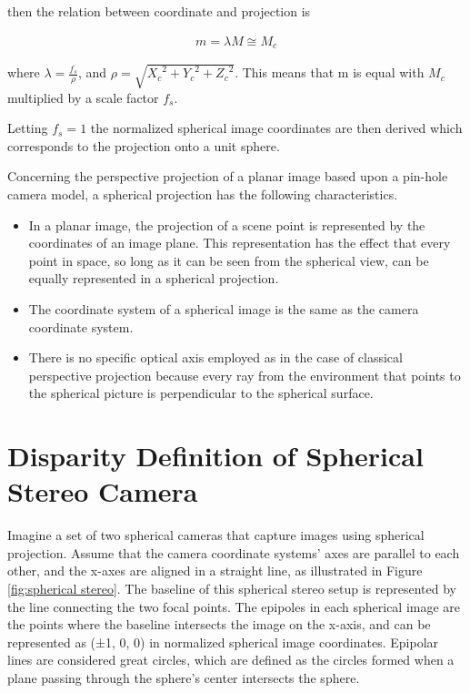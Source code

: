 \documentclass[english, LaM, oneside]{sapthesis}%
\begin{document}
\vspace{0.8cm}

then the relation between coordinate and projection is

\begin{equation}\label{eq:5}
\begin{flalign*}
         m = \lambda M \cong M_c
    \end{flalign*}
\end{equation}

\vspace{0.8cm}

where $\lambda = \frac{f_s}{\rho}$, and $\rho = \sqrt{{X_c}^2 + {Y_c}^2 + {Z_c}^2}$.
This means that m is equal with $M_c$ multiplied by a scale factor $f_s$\cite{ref:Binocular spherical,ref:Spherical stereo}. 

Letting $f_s = 1$ the normalized spherical image coordinates are then derived which corresponds to the projection onto a unit sphere.

Concerning the perspective projection of a planar image based upon a pin-hole camera model, a spherical projection has the following characteristics\cite{ref:Binocular spherical,ref:Spherical stereo}.
\begin{itemize}
  \item In a planar image, the projection of a scene point is represented by the coordinates of an image plane. This representation has the effect that every point in space, so long as it can be seen from the spherical view, can be equally represented in a spherical projection.
  \item The coordinate system of a spherical image is the same as the camera coordinate system.
  \item There is no specific optical axis employed as in the case of classical perspective projection because every ray from the environment that points to the spherical picture is perpendicular to the spherical surface.
  
\end{itemize}

\section{Disparity Definition of Spherical Stereo Camera}
\label{sec:Spherical disparity}

Imagine a set of two spherical cameras that capture images using spherical projection. Assume that the camera coordinate systems' axes are parallel to each other, and the x-axes are aligned in a straight line, as illustrated in Figure \ref{fig:spherical stereo}. The baseline of this spherical stereo setup is represented by the line connecting the two focal points. The epipoles in each spherical image are the points where the baseline intersects the image on the x-axis, and can be represented as (±1, 0, 0) in normalized spherical image coordinates. Epipolar lines are considered great circles, which are defined as the circles formed when a plane passing through the sphere's center intersects the sphere\cite{ref:Binocular spherical,ref:Spherical stereo}.
\end{document}
